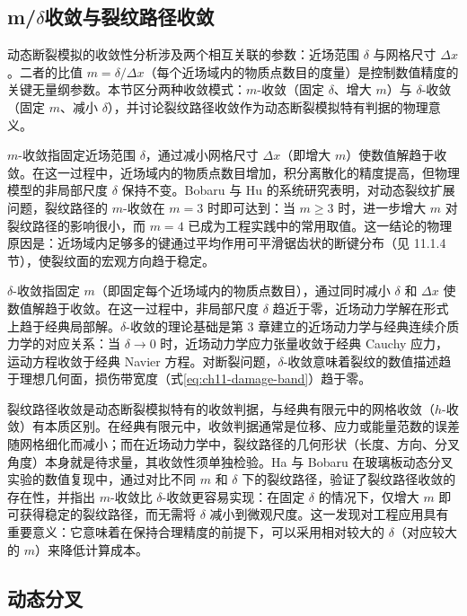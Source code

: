 \subsection{m/\texorpdfstring{$\delta$}{delta}收敛与裂纹路径收敛}\label{sec:ch11-m-convergence}

动态断裂模拟的收敛性分析涉及两个相互关联的参数：近场范围 $\delta$ 与网格尺寸 $\Delta x$。二者的比值 $m=\delta/\Delta x$（每个近场域内的物质点数目的度量）是控制数值精度的关键无量纲参数。本节区分两种收敛模式：$m$-收敛（固定 $\delta$、增大 $m$）与 $\delta$-收敛（固定 $m$、减小 $\delta$），并讨论裂纹路径收敛作为动态断裂模拟特有判据的物理意义。

$m$-收敛指固定近场范围 $\delta$，通过减小网格尺寸 $\Delta x$（即增大 $m$）使数值解趋于收敛。在这一过程中，近场域内的物质点数目增加，积分离散化的精度提高，但物理模型的非局部尺度 $\delta$ 保持不变。Bobaru 与 Hu \cite{BobaruHu2012} 的系统研究表明，对动态裂纹扩展问题，裂纹路径的 $m$-收敛在 $m=3$ 时即可达到：当 $m\geq 3$ 时，进一步增大 $m$ 对裂纹路径的影响很小，而 $m=4$ 已成为工程实践中的常用取值。这一结论的物理原因是：近场域内足够多的键通过平均作用可平滑锯齿状的断键分布（见 11.1.4 节），使裂纹面的宏观方向趋于稳定。

$\delta$-收敛指固定 $m$（即固定每个近场域内的物质点数目），通过同时减小 $\delta$ 和 $\Delta x$ 使数值解趋于收敛。在这一过程中，非局部尺度 $\delta$ 趋近于零，近场动力学解在形式上趋于经典局部解。$\delta$-收敛的理论基础是第 3 章建立的近场动力学与经典连续介质力学的对应关系：当 $\delta\to 0$ 时，近场动力学应力张量收敛于经典 Cauchy 应力，运动方程收敛于经典 Navier 方程。对断裂问题，$\delta$-收敛意味着裂纹的数值描述趋于理想几何面，损伤带宽度（式\eqref{eq:ch11-damage-band}）趋于零。

裂纹路径收敛是动态断裂模拟特有的收敛判据，与经典有限元中的网格收敛（$h$-收敛）有本质区别。在经典有限元中，收敛判据通常是位移、应力或能量范数的误差随网格细化而减小；而在近场动力学中，裂纹路径的几何形状（长度、方向、分叉角度）本身就是待求量，其收敛性须单独检验。Ha 与 Bobaru \cite{HaBobaru2010} 在玻璃板动态分叉实验的数值复现中，通过对比不同 $m$ 和 $\delta$ 下的裂纹路径，验证了裂纹路径收敛的存在性，并指出 $m$-收敛比 $\delta$-收敛更容易实现：在固定 $\delta$ 的情况下，仅增大 $m$ 即可获得稳定的裂纹路径，而无需将 $\delta$ 减小到微观尺度。这一发现对工程应用具有重要意义：它意味着在保持合理精度的前提下，可以采用相对较大的 $\delta$（对应较大的 $m$）来降低计算成本。

\subsection{动态分叉}\label{sec:ch11-branching}

